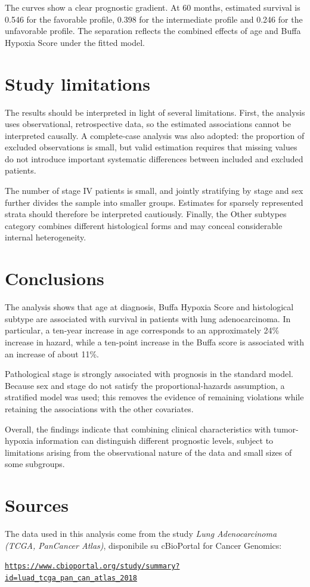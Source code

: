 \documentclass[12pt,a4paper]{article}
\begin{document}
The curves show a clear prognostic gradient. At 60 months, estimated survival is 0.546 for the favorable profile, 0.398 for the intermediate profile and 0.246 for the unfavorable profile. The separation reflects the combined effects of age and Buffa Hypoxia Score under the fitted model.

\section{Study limitations}

The results should be interpreted in light of several limitations. First, the analysis uses observational, retrospective data, so the estimated associations cannot be interpreted causally. A complete-case analysis was also adopted: the proportion of excluded observations is small, but valid estimation requires that missing values do not introduce important systematic differences between included and excluded patients.

The number of stage IV patients is small, and jointly stratifying by stage and sex further divides the sample into smaller groups. Estimates for sparsely represented strata should therefore be interpreted cautiously. Finally, the Other subtypes category combines different histological forms and may conceal considerable internal heterogeneity.

\section{Conclusions}

The analysis shows that age at diagnosis, Buffa Hypoxia Score and histological subtype are associated with survival in patients with lung adenocarcinoma. In particular, a ten-year increase in age corresponds to an approximately 24\% increase in hazard, while a ten-point increase in the Buffa score is associated with an increase of about 11\%.

Pathological stage is strongly associated with prognosis in the standard model. Because sex and stage do not satisfy the proportional-hazards assumption, a stratified model was used; this removes the evidence of remaining violations while retaining the associations with the other covariates.

Overall, the findings indicate that combining clinical characteristics with tumor-hypoxia information can distinguish different prognostic levels, subject to limitations arising from the observational nature of the data and small sizes of some subgroups.

\section{Sources}

The data used in this analysis come from the study
\textit{Lung Adenocarcinoma (TCGA, PanCancer Atlas)}, disponibile su cBioPortal for Cancer Genomics:

\begin{center}
\href{https://www.cbioportal.org/study/summary?id=luad_tcga_pan_can_atlas_2018}
{\texttt{https://www.cbioportal.org/study/summary?id=luad\_tcga\_pan\_can\_atlas\_2018}}
\end{center}
\end{document}
